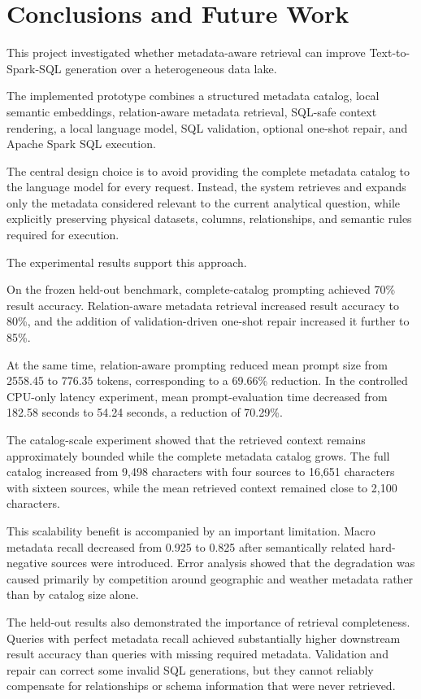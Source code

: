 \section{Conclusions and Future Work}
\label{sec:conclusions}

This project investigated whether metadata-aware retrieval can improve
Text-to-Spark-SQL generation over a heterogeneous data lake.

The implemented prototype combines a structured metadata catalog, local
semantic embeddings, relation-aware metadata retrieval, SQL-safe context
rendering, a local language model, SQL validation, optional one-shot repair,
and Apache Spark SQL execution.

The central design choice is to avoid providing the complete metadata catalog
to the language model for every request. Instead, the system retrieves and
expands only the metadata considered relevant to the current analytical
question, while explicitly preserving physical datasets, columns,
relationships, and semantic rules required for execution.

The experimental results support this approach.

On the frozen held-out benchmark, complete-catalog prompting achieved 70\%
result accuracy. Relation-aware metadata retrieval increased result accuracy
to 80\%, and the addition of validation-driven one-shot repair increased it
further to 85\%.

At the same time, relation-aware prompting reduced mean prompt size from
2558.45 to 776.35 tokens, corresponding to a 69.66\% reduction. In the
controlled CPU-only latency experiment, mean prompt-evaluation time decreased
from 182.58 seconds to 54.24 seconds, a reduction of 70.29\%.

The catalog-scale experiment showed that the retrieved context remains
approximately bounded while the complete metadata catalog grows. The full
catalog increased from 9,498 characters with four sources to 16,651
characters with sixteen sources, while the mean retrieved context remained
close to 2,100 characters.

This scalability benefit is accompanied by an important limitation. Macro
metadata recall decreased from 0.925 to 0.825 after semantically related
hard-negative sources were introduced. Error analysis showed that the
degradation was caused primarily by competition around geographic and weather
metadata rather than by catalog size alone.

The held-out results also demonstrated the importance of retrieval
completeness. Queries with perfect metadata recall achieved substantially
higher downstream result accuracy than queries with missing required
metadata. Validation and repair can correct some invalid SQL generations, but
they cannot reliably compensate for relationships or schema information that
were never retrieved.

